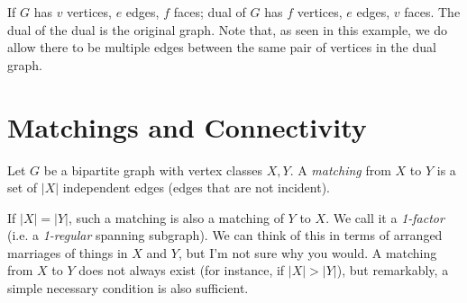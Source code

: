 \documentclass[10pt,a4paper]{article}
\begin{document}
\begin{center}
\end{center}
\vspace{-4cm}
If $G$ has $v$ vertices, $e$ edges, $f$ faces; dual of $G$ has $f$ vertices, $e$ edges, $v$ faces. The dual of the dual is the original graph. Note that, as seen in this example, we do allow there to be multiple edges between the same pair of vertices in the dual graph.

\section{Matchings and Connectivity}
Let $G$ be a bipartite graph with vertex classes $X, Y$. A \emph{matching} from $X$ to $Y$ is a set of $|X|$ independent edges (edges that are not incident).
\begin{center}
\end{center}
If $|X| = |Y|$, such a matching is also a matching of $Y$ to $X$. We call it a \emph{1-factor} (i.e. a \emph{1-regular} spanning subgraph). We can think of this in terms of arranged marriages of things in $X$ and $Y$, but I'm not sure why you would. A matching from $X$ to $Y$ does not always exist (for instance, if $|X|>|Y|$), but remarkably, a simple necessary condition is also sufficient.
\end{document}
